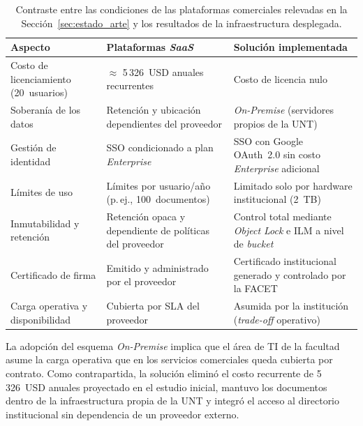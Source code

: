 \begin{table}[!htbp]
    \centering
    \small
    \caption[Comparativa final: plataformas \textit{SaaS} versus solución implementada]{Contraste
    entre las condiciones de las plataformas comerciales relevadas en la
    Sección~\ref{sec:estado_arte} y los resultados de la infraestructura desplegada.}
    \label{tab:comparativa_final}
    \begin{tabular}{p{3.4cm} p{4.5cm} p{4.5cm}}
        \toprule
        \textbf{Aspecto} &
        \textbf{Plataformas \textit{SaaS}} &
        \textbf{Solución implementada} \\
        \midrule
        Costo de licenciamiento (20~usuarios) &
        \(\approx\) 5\,326~USD anuales recurrentes &
        Costo de licencia nulo \\
        \addlinespace
        Soberanía de los datos &
        Retención y ubicación dependientes del proveedor &
        \textit{On-Premise} (servidores propios de la UNT) \\
        \addlinespace
        Gestión de identidad &
        SSO condicionado a plan \textit{Enterprise} &
        SSO con Google OAuth~2.0 sin costo \textit{Enterprise} adicional \\
        \addlinespace
        Límites de uso &
        Límites por usuario/año (p.\,ej., 100~documentos) &
        Limitado solo por hardware institucional (2~TB) \\
        \addlinespace
        Inmutabilidad y retención &
        Retención opaca y dependiente de políticas del proveedor &
        Control total mediante \textit{Object Lock} e ILM a nivel de \textit{bucket} \\
        \addlinespace
        Certificado de firma &
        Emitido y administrado por el proveedor &
        Certificado institucional generado y controlado por la FACET \\
        \addlinespace
        Carga operativa y disponibilidad &
        Cubierta por SLA del proveedor &
        Asumida por la institución (\textit{trade-off} operativo) \\
        \bottomrule
    \end{tabular}
\end{table}

\FloatBarrier

La adopción del esquema \textit{On-Premise} implica que el área de TI de la facultad asume
la carga operativa que en los servicios comerciales queda cubierta por contrato.
Como contrapartida, la solución eliminó el costo recurrente de 5\,326~USD anuales
proyectado en el estudio inicial, mantuvo los documentos dentro de la
infraestructura propia de la UNT y integró el acceso al directorio
institucional sin dependencia de un proveedor externo.
